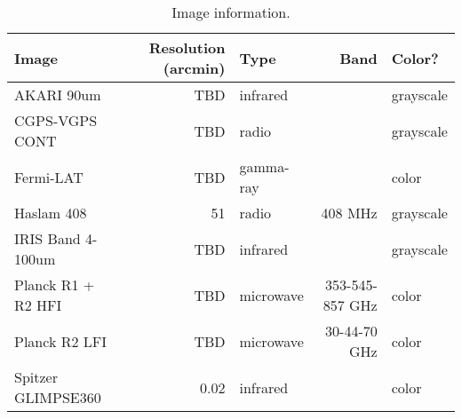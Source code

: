 
\begin{table}[h]

\caption{Image information.}
\label{tab:a}
\begin{tabular}{ lrlrl }
\hline

Image & Resolution (arcmin) & Type & Band & Color?\\ \hline
AKARI 90um & TBD & infrared &  & grayscale\\
CGPS-VGPS CONT & TBD & radio &  & grayscale\\
Fermi-LAT & TBD & gamma-ray &  & color\\
Haslam 408 & 51 & radio & 408 MHz & grayscale\\
IRIS Band 4-100um & TBD & infrared &  & grayscale\\
Planck R1 + R2 HFI & TBD & microwave & 353-545-857 GHz & color\\
Planck R2 LFI & TBD & microwave & 30-44-70 GHz & color\\
Spitzer GLIMPSE360 & 0.02 & infrared &  & color\\
\hline
\end{tabular}

\end{table}
